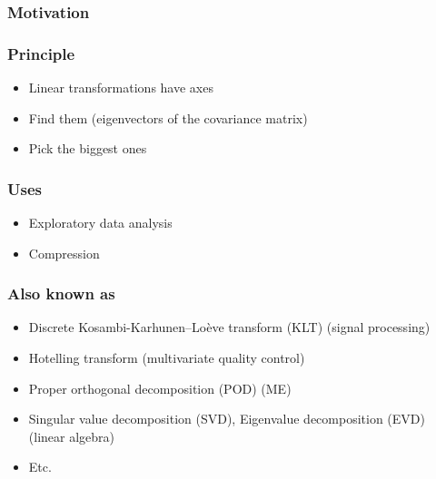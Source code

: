 \begin{frame}
\end{frame}





\begin{frame}

\end{frame}

\begin{frame}
  \frametitle{Motivation}
\end{frame}

\begin{frame}[t]
  \frametitle{Principle}

  \vspace{1cm}
  \begin{itemize}
  \item Linear transformations have axes
  \item Find them (eigenvectors of the covariance matrix)
  \item Pick the biggest ones
  \end{itemize}

  \vspace{5mm}
\end{frame}

\begin{frame}
  \frametitle{Uses}
  \begin{itemize}
  \item Exploratory data analysis
  \item Compression
  \end{itemize}
\end{frame}

\begin{frame}
  \frametitle{Also known as}
  \begin{itemize}
  \item Discrete Kosambi-Karhunen–Loève transform (KLT) (signal processing)
  \item Hotelling transform (multivariate quality control)
  \item Proper orthogonal decomposition (POD) (ME)
  \item Singular value decomposition (SVD), Eigenvalue decomposition (EVD) (linear algebra)
  \item Etc.
  \end{itemize}
\end{frame}

